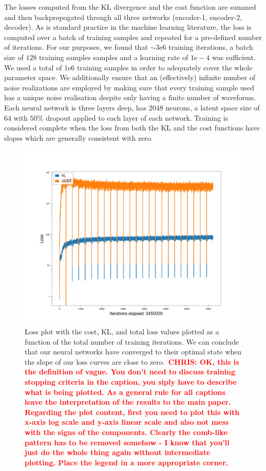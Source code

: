 \documentclass[%
showpacs,
 amsmath,amssymb,
 aps,
 twocolumn,
 prl,
 reprint,
floatfix,
]{revtex4-1}
\newcommand{\chris}[1]{\textbf{\textcolor{red}{CHRIS: #1}}}
\begin{document}
The losses computed from the KL divergence and the cost function are summed and then backpropogated through all three
networks (encoder-1, encoder-2, decoder). As is standard practice in the 
machine learning literature, the loss is computed over a batch of training 
samples and repeated for a pre-defined number of iterations. For our purposes, we found that
$\sim3\textrm{e}6$ training iterations, a batch size of $128$ training samples
samples and a learning rate of $1\textrm{e}-4$ was sufficient. We used a total of $1\textrm{e}6$ training samples in order to adequately cover the whole 
parameter space.
We additionally ensure that an (effectively) infinite number of noise
realizations are employed by making sure that every training sample used has a unique noise realisation despite only having a finite number of waveforms. 
Each neural network is three layers
deep, has $2048$ neurons, a latent space size of $64$ with $50\%$ dropout
applied to each layer of each network. Training is considered complete when 
the loss from both the KL and the cost functions have slopes which 
are generally consistent with zero.

%
%
\begin{figure}
    \includegraphics[width=\columnwidth]{images/losses_logscale.png}
    \caption{\label{fig:loss_log} Loss plot with the cost, KL, and total loss
values plotted as a function of the total number of training iterations. We can
conclude that our neural networks have converged to their optimal state when
the slope of our loss curves are close to zero.~\chris{OK, this is the
definition of vague. You don't need to discuss training stopping criteria in
the caption, you siply have to describe what is being plotted. As a general
rule for all captions leave the interpretation of the results to the main
paper. Regarding the plot content, first you need to plot this with x-axis log
scale and y-axis linear scale and also not mess with the signs of the
components. Clearly the comb-like pattern has to be removed somehow - I know
that you'll just do the whole thing again without intermediate plotting. Place
the legend in a more appropriate corner.}} 
\end{figure}
\end{document}
